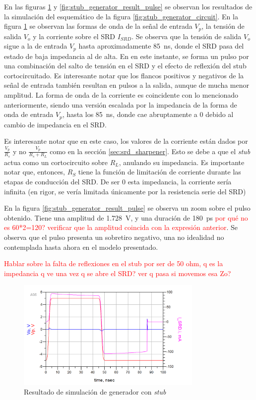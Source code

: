 En las figuras \ref{fig:generator_result_waves} y
\ref{fig:stub_generator_result_pulse} se observan los resultados de la
simulación del esquemático de la figura \ref{fig:stub_generator_circuit}. En la
figura \ref{fig:generator_result_waves} se observan las formas de onda de la
señal de entrada $V_p$, la tensión de salida $V_o$ y la corriente sobre el SRD
$I_{SRD}$. Se observa que la tensión de salida $V_o$ sigue a la de entrada $V_p$
hasta aproximadamente \qty{85}{\nano\second}, donde el SRD pasa del estado de
baja impedancia al de alta. En en este instante, se forma un pulso por una
combinación del salto de tensión en el SRD y el efecto de reflexión del stub
cortocircuitado. Es interesante notar que los flancos positivos y negativos de
la señal de entrada también resultan en pulsos a la salida, aunque de mucha
menor amplitud. La forma de onda de la corriente es coincidente con lo
mencionado anteriormente, siendo una versión escalada por la impedancia de la
forma de onda de entrada $V_p$, hasta los \qty{85}{\nano\second}, donde cae
abruptamente a $0$ debido al cambio de impedancia en el SRD.

Es interesante notar que en este caso, los valores de la corriente están dados
por $\frac{V_p}{R_s}$ y no $\frac{V_p}{R_s+R_L}$ como en la sección
\ref{sec:srd_sharpener}. Esto se debe a que el \textit{stub} actua como un
cortocircuito sobre $R_L$, anulando su impedancia. Es importante notar que,
entonces, $R_S$ tiene la función de limitación de corriente durante las etapas
de conducción del SRD. De ser $0$ esta impedancia, la corriente sería infinita
(en rigor, se vería limitada únicamente por la resistencia serie del SRD)

En la figura \ref{fig:stub_generator_result_pulse} se observa un zoom sobre el
pulso obtenido. Tiene una amplitud de \qty{1.728}{\volt}, y una duración
de \qty{180}{\pico\second} \textcolor{red}{por qué no es 60*2=120?}
\textcolor{red}{verificar que la amplitud coincida con la expresión anterior}.
Se observa que el pulso presenta un sobretiro negativo, una no idealidad no
contemplada hasta ahora en el modelo presentado.

\textcolor{red}{Hablar sobre la falta de reflexiones en el stub por ser de 50
ohm, q es la impedancia q ve una vez q se abre el SRD? ver q pasa si movemos esa
Zo?}

\begin{figure}[tbp]
    \centering
    \includegraphics[width=0.8\textwidth]{images/stub_generator_result_waves.png}
    \caption{Resultado de simulación de generador con \textit{stub}}
    \label{fig:generator_result_waves}
\end{figure}


